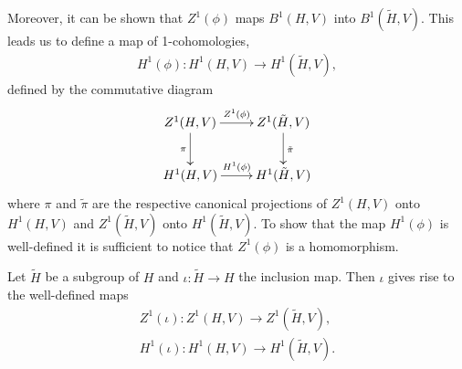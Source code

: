 Moreover, it can be shown that $Z^1(\phi)$ maps $B^1(H, V)$ into $B^1(\tilde{H}, V)$. This leads us to define a map of 1-cohomologies,
\begin{eqnarray*}
	H^1(\phi):H^1(H, V) \rightarrow H^1(\tilde{H}, V),
\end{eqnarray*}
defined by the commutative diagram
\begin{displaymath}
	\xymatrix{
	Z^1(H, V) \ar[d]_{\pi} \ar[r]^{Z^1(\phi)} & Z^1(\tilde{H}, V) \ar[d]^{\tilde{\pi}}\\
	H^1(H, V) \ar[r]^{H^1(\phi)} & H^1(\tilde{H}, V)
	}
\end{displaymath}
where $\pi$ and $\tilde\pi$ are the respective canonical projections of $Z^1(H, V)$ onto $H^1(H, V)$ and $Z^1(\tilde{H}, V)$ onto $H^1(\tilde{H}, V)$. To show that the map $H^1(\phi)$ is well-defined it is sufficient to notice that $Z^1(\phi)$ is a homomorphism.

\begin{example}
Let $\tilde{H}$ be a subgroup of $H$ and $\iota:\tilde{H}\rightarrow H$ the inclusion map. Then $\iota$ gives rise to the well-defined maps
\begin{eqnarray*}
  Z^1(\iota): Z^1(H, V) \rightarrow Z^1(\tilde{H}, V), \\
H^1(\iota):H^1(H, V)\rightarrow H^1(\tilde{H}, V).
\end{eqnarray*}
\end{example}

